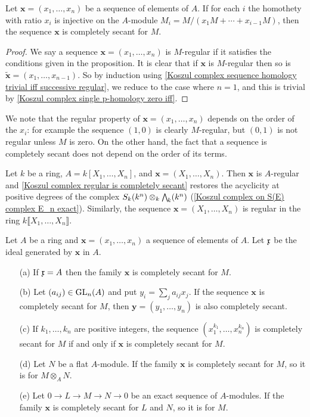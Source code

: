 \begin{proposition}\label{Koszul complex regular is completely secant}
Let $\bm{x}=(x_1,\dots,x_n)$ be a sequence of elements of $A$. If for each $i$ the homothety with ratio $x_i$ is injective on the $A$-module $M_i=M/(x_1M+\cdots+x_{i-1}M)$, then the sequence $\bm{x}$ is completely secant for $M$.
\end{proposition}
\begin{proof}
We say a sequence $\bm{x}=(x_1,\dots,x_n)$ is $M$-regular if it satisfies the conditions given in the proposition. It is clear that if $\bm{x}$ is $M$-regular then so is $\tilde{\bm{x}}=(x_1,\dots,x_{n-1})$. So by induction using \cref{Koszul complex sequence homology trivial iff successive regular}, we reduce to the case where $n=1$, and this is trivial by \cref{Koszul complex single p-homology zero iff}.
\end{proof}
We note that the regular property of $\bm{x}=(x_1,\dots,x_n)$ depends on the order of the $x_i$: for example the sequence $(1,0)$ is clearly $M$-regular, but $(0,1)$ is not regular unless $M$ is zero. On the other hand, the fact that a sequence is completely secant does not depend on the order of its terms.
\begin{example}
Let $k$ be a ring, $A=k[X_1,\dots,X_n]$, and $\bm{x}=(X_1,\dots,X_n)$. Then $\bm{x}$ is $A$-regular and \cref{Koszul complex regular is completely secant} restores the acyclicity at positive degrees of the complex $S_k(k^n)\otimes_k\bigw_k(k^n)$ (\cref{Koszul complex on S(E) complex E_n exact}). Similarly, the sequence $\bm{x}=(X_1,\dots,X_n)$ is regular in the ring $k\llbracket X_1,\dots,X_n\rrbracket$.
\end{example}
\begin{proposition}\label{Koszul complex completely secant prop}
Let $A$ be a ring and $\bm{x}=(x_1,\dots,x_n)$ a sequence of elements of $A$. Let $\mathfrak{x}$ be the ideal generated by $\bm{x}$ in $A$.
\begin{itemize}
\item[(a)] If $\mathfrak{x}=A$ then the family $\bm{x}$ is completely secant for $M$.
\item[(b)] Let $(a_{ij})\in\mathrm{GL}_n(A)$ and put $y_i=\sum_ja_{ij}x_j$. If the sequence $\bm{x}$ is completely secant for $M$, then $\bm{y}=(y_1,\dots,y_n)$ is also completely secant.
\item[(c)] If $k_1,\dots,k_n$ are positive integers, the sequence $(x_1^{k_1},\dots,x_n^{k_n})$ is completely secant for $M$ if and only if $\bm{x}$ is completely secant for $M$.
\item[(d)] Let $N$ be a flat $A$-module. If the family $\bm{x}$ is completely secant for $M$, so it is for $M\otimes_AN$.
\item[(e)] Let $0\to L\to M\to N\to 0$ be an exact sequence of $A$-modules. If the family $\bm{x}$ is completely secant for $L$ and $N$, so it is for $M$.
\end{itemize}
\end{proposition}
